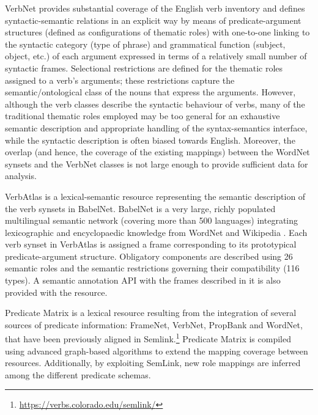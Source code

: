 \documentclass[output=paper,colorlinks,citecolor=brown]{langscibook}
\begin{document}
VerbNet \citep{Kipper-Schuler2005,Kipper2008} provides substantial coverage of the English verb inventory and defines syntactic-semantic relations in an explicit way by means of predicate-argument structures (defined as configurations of thematic roles) with one-to-one linking to the syntactic category (type of phrase) and grammatical function (subject, object, etc.) of each argument expressed in terms of a relatively small number of syntactic frames. Selectional restrictions are defined for the thematic roles assigned to a verb’s arguments; these restrictions capture the semantic/ontological class of the nouns that express the arguments. However, although the verb classes describe the syntactic behaviour of verbs, many of the traditional thematic roles employed may be too general for an exhaustive semantic description and appropriate handling of the syntax-semantics interface, while the syntactic description is often biased towards English. Moreover, the overlap (and hence, the coverage of the existing mappings) between the WordNet synsets and the VerbNet classes is not large enough to provide sufficient data for analysis.

VerbAtlas \citep{di-fabio-etal-2019-verbatlas} is a lexical-semantic resource representing the semantic description of the verb synsets in BabelNet. BabelNet is a very large, richly populated multilingual semantic network (covering more than 500 languages) integrating lexicographic and encyclopaedic knowledge from WordNet and Wikipedia \citep{navigli-ponzetto-2010-babelnet}. Each verb synset in VerbAtlas is assigned a frame corresponding to its prototypical predicate-argument structure. Obligatory components are described using 26 semantic roles and the semantic restrictions governing their compatibility (116 types). A semantic annotation API with the frames described in it is also provided with the resource. 

Predicate Matrix \citep{lopez-de-lacalle-etal-2014-predicate} is a lexical resource resulting from the integration of several sources of predicate information: FrameNet, VerbNet, PropBank and WordNet, that have been previously aligned in Semlink.\footnote{\url{https://verbs.colorado.edu/semlink/}} \citep{Palmer2009} Predicate Matrix is compiled using advanced graph-based algorithms to extend the mapping coverage between resources. Additionally, by exploiting SemLink, new role mappings are inferred among the different predicate schemas. 

\end{document}
